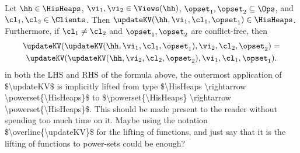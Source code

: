 \begin{proposition}
\label{prop:updatekv_commutative}
Let $\hh \in \HisHeaps$, $\vi_1, \vi_2 \in \Views(\hh)$, $\opset_1, \opset_2 \subseteq \Ops$, and $\cl_1, \cl_2 \in \Clients$. 
Then $\updateKV(\hh, \vi_1, \cl_1, \opset_1) \in \HisHeaps$. Furthermore, if $\cl_1 \neq \cl_2$ and $\opset_1, \opset_2$ 
are conflict-free, then 
\begin{multline*}
\updateKV(\updateKV(\hh, \vi_1, \cl_1, \opset_1), \vi_2, \cl_2, \opset_2)  =\\ 
\updateKV(\updateKV(\hh, \vi_2, \cl_2, \opset_2), \vi_1, \cl_1, \opset_1).
\end{multline*}
\ac{in both the LHS and RHS of the formula above, the outermost application of $\updateKV$ is implicitly lifted from type 
$\HisHeaps \rightarrow \powerset{\HisHeaps}$ to $\powerset{\HisHeaps} \rightarrow \powerset{\HisHeaps}$. This should 
be made present to the reader without spending too much time on it. Maybe using the notation $\overline{\updateKV}$ for 
the lifting of functions, and just say that it is the lifting of functions to power-sets could be enough?}
\end{proposition}
%




